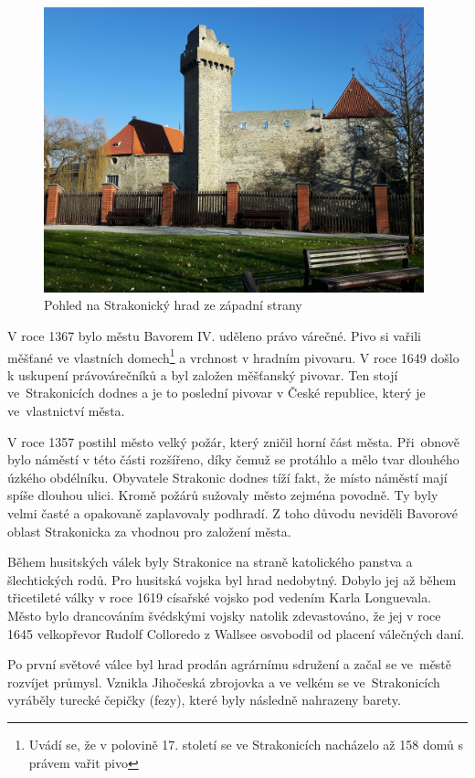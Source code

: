 \documentclass[thesis=M,czech]{FITthesis}[2012/06/26]
\begin{document}
\begin{figure}[h!]
	\centering
	\includegraphics[width=11cm]{pics/hrad.jpg}
	\caption{Pohled na Strakonický hrad ze západní strany}
	\label{obrazek:hrad}
\end{figure}

V roce 1367 bylo městu Bavorem IV. uděleno právo várečné. Pivo si vařili měšťané ve vlastních domech\footnote{Uvádí se, že v polovině 17. století se ve Strakonicích nacházelo až 158 domů s právem vařit pivo} a vrchnost v hradním pivovaru. V roce 1649 došlo k uskupení právovárečníků a byl založen měšťanský pivovar. Ten stojí ve~Strakonicích dodnes a je to poslední pivovar v České republice, který je ve~vlastnictví města. 

V roce 1357 postihl město velký požár, který zničil horní část města. Při~obnově bylo náměstí v této části rozšířeno, díky čemuž se protáhlo a mělo tvar dlouhého úzkého obdélníku. Obyvatele Strakonic dodnes tíží fakt, že místo náměstí mají spíše dlouhou ulici. Kromě požárů sužovaly město zejména povodně. Ty byly velmi časté a opakovaně zaplavovaly podhradí. Z toho důvodu neviděli Bavorové oblast Strakonicka za vhodnou pro založení města.

Během husitských válek byly Strakonice na straně katolického panstva a šlechtických rodů. Pro husitská vojska byl hrad nedobytný. Dobylo jej až během třicetileté války v roce 1619 císařské vojsko pod vedením Karla Longuevala. Město bylo drancováním švédskými vojsky natolik zdevastováno, že jej v roce 1645 velkopřevor Rudolf Colloredo z Wallsee osvobodil od placení válečných daní.

Po první světové válce byl hrad prodán agrárnímu sdružení a začal se ve~městě rozvíjet průmysl. Vznikla Jihočeská zbrojovka a ve velkém se ve~Strakonicích vyráběly turecké čepičky (fezy), které byly následně nahrazeny barety. 
\end{document}
